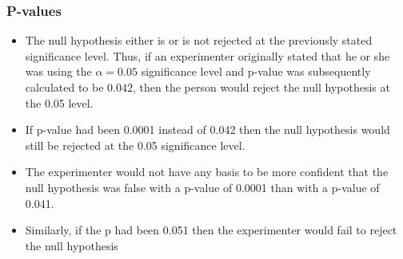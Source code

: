 \begin{frame}
\frametitle{P-values}
\large
\begin{itemize}
\item The null hypothesis either is or is not rejected at the previously stated significance level. Thus, if an experimenter originally stated that he or she was using the $\alpha = 0.05$ significance level and p-value was subsequently calculated to be $0.042$, then the person would reject the null hypothesis at the 0.05 level. \item If p-value had been 0.0001 instead of 0.042 then the null hypothesis would still be rejected at the 0.05 significance level.  \item
The experimenter would not have any basis to be more confident that the null hypothesis was false with a p-value of 0.0001 than with a p-value of 0.041. \item Similarly, if the p had been 0.051 then the experimenter would fail to reject the null hypothesis
\end{itemize}

\end{frame}

